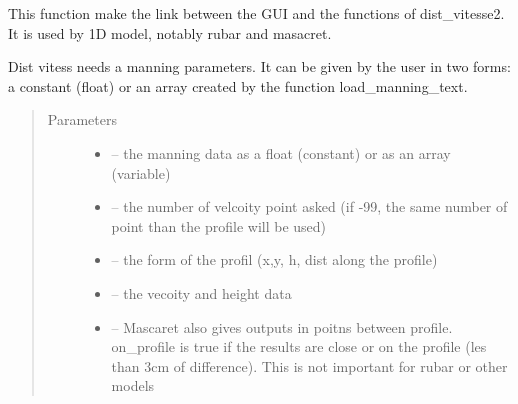 \documentclass[letterpaper,10pt,english]{sphinxmanual}
\begin{document}
\begin{fulllineitems}
\label{\detokenize{index:src.dist_vistess2.distribute_velocity}}
This function make the link between the GUI and the functions of dist\_vitesse2. It is used by 1D model,
notably rubar and masacret.

Dist vitess needs a manning parameters. It can be given by the user in two forms: a constant (float) or an array
created by the function load\_manning\_text.
\begin{quote}\begin{description}
\item[{Parameters}] \leavevmode\begin{itemize}
\item {} 
 -- the manning data as a float (constant) or as an array (variable)

\item {} 
 -- the number of velcoity point asked (if -99, the same number of point than the profile
will be used)

\item {} 
 -- the form of the profil (x,y, h, dist along the profile)

\item {} 
 -- the vecoity and height data

\item {} 
 -- Mascaret also gives outputs in poitns between profile. on\_profile is true if the results are
close or on the profile (les than 3cm of difference). This is not important for rubar or other models

\end{itemize}

\end{description}\end{quote}

\end{fulllineitems}

\end{document}
